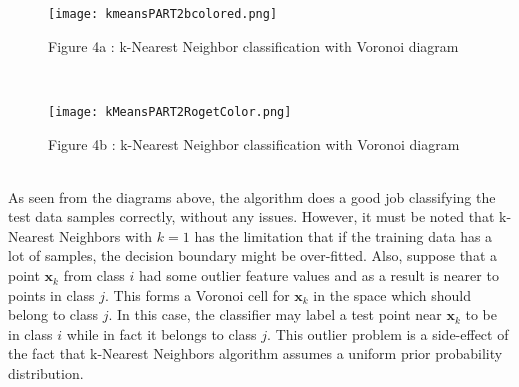 \begin{wrapfigure}{}{\textwidth}
  \begin{center}
      \texttt{[image: kmeansPART2bcolored.png]}
          \caption{Figure 4a : k-Nearest Neighbor classification with Voronoi diagram}
           \end{center}
           \end{wrapfigure}
           \\
           \begin{wrapfigure}{}{\textwidth}
             \begin{center}
                 \texttt{[image: kMeansPART2RogetColor.png]}
                     \caption{Figure 4b : k-Nearest Neighbor classification with Voronoi diagram}
                      \end{center}
                      \end{wrapfigure}
                      \\ As seen from the diagrams above, the algorithm does a good job classifying the test data samples correctly, without any issues. However, it must be noted that k-Nearest Neighbors with $k=1$ has the limitation that if the training data has a lot of samples, the decision boundary might be over-fitted. Also, suppose that a point $\bm{x}_k$ from class $i$ had some outlier feature values and as a result is nearer to points in class $j$. This forms a Voronoi cell for
                      $\bm{x}_k$ in the space which should belong to class $j$. In this case, the classifier may label a test point near $\bm{x}_k$ to be in class $i$ while in fact it belongs to class $j$. This outlier problem is a side-effect of the fact that k-Nearest Neighbors algorithm assumes a uniform prior probability distribution.

